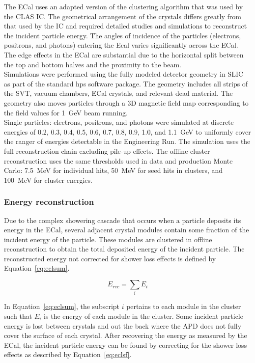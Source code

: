The ECal uses an adapted version of the clustering algorithm that was used by the CLAS IC. The geometrical arrangement of the crystals differs greatly from that used by the IC and required detailed studies and simulations to reconstruct the incident particle energy. The angles of incidence of the particles (electrons, positrons, and photons) entering the Ecal varies significantly across the ECal. The edge effects in the ECal are substantial due to the horizontal split between the top and bottom halves and  the proximity to the beam. \\
\indent Simulations were performed using the fully modeled detector geometry in SLIC as part of the standard hps software package. The geometry includes all strips of the SVT, vacuum chambers, ECal crystals, and relevant dead material. The geometry also moves particles through a 3D magnetic field map corresponding to the field values for 1~GeV beam running.~\cite{CalibNote} \\
\indent Single particles: electrons, positrons, and photons were simulated at discrete energies of 0.2, 0.3, 0.4, 0.5, 0.6, 0.7, 0.8,  0.9, 1.0, and 1.1~GeV to uniformly cover the ranger of energies detectable in the Engineering Run. The simulation uses the full reconstruction chain excluding pile-up effects. The offline cluster reconstruction uses the same thresholds used in data and production Monte Carlo: 7.5~MeV for individual hits, 50~MeV for seed hits in clusters, and 100~MeV for cluster energies.\\

\subsubsection{Energy reconstruction}
\indent Due to the complex showering cascade that occurs when a particle deposits its energy in the ECal, several adjacent crystal modules contain some fraction of the incident energy of the particle. These modules are clustered in offline reconstruction to obtain the total deposited energy of the incident particle. The reconstructed energy not corrected for shower loss effects is defined by Equation~\eqref{eq:eclsum}.

\begin{equation}
\label{eq:eclsum}
E_{rec} = \sum_i E_i    
\end{equation}

In Equation~\eqref{eq:eclsum}, the subscript $i$ pertains to each module in the cluster such that $E_i$ is the energy of each module in the cluster. Some incident particle energy is lost between crystals and out the back where the APD does not fully cover the surface of each crystal. After recovering the energy as measured by the ECal, the incident particle energy can be found by correcting for the shower loss effects as described by Equation~\eqref{eq:eclsf}.


